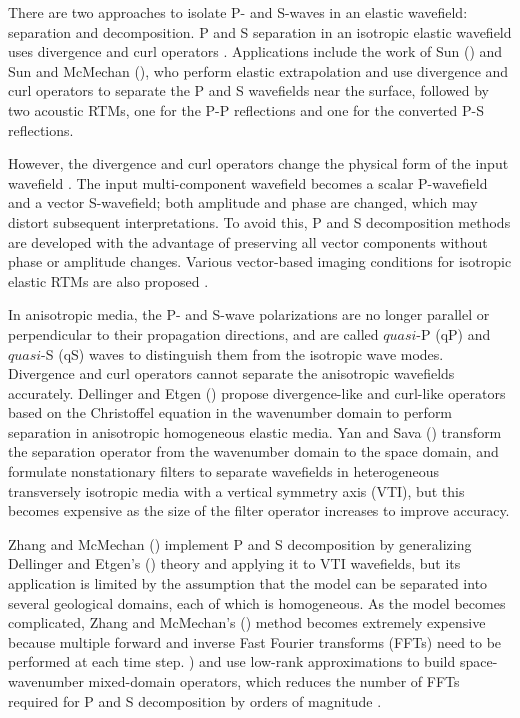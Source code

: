 \documentclass[manuscript,ulem,graphix,revised]{geophysics}
\begin{document}
There are two approaches to isolate P- and S-waves in an elastic wavefield: separation and decomposition. P and S separation in an isotropic elastic wavefield uses divergence and curl operators \citep{morse53,clayton81,mora87}. Applications include the work of Sun (\citeyear{sun99}) and Sun and McMechan (\citeyear{sun01}), who perform elastic extrapolation and use divergence and curl operators to separate the P and S wavefields near the surface, followed by two acoustic RTMs, one for the P-P reflections and one for the converted P-S reflections. 

However, the divergence and curl operators change the physical form of the input wavefield \citep{wenlong_ps15}. The input multi-component wavefield becomes a scalar P-wavefield and a vector S-wavefield; both amplitude and phase are changed, which may distort subsequent interpretations. To avoid this, P and S decomposition methods 
\citep{ma03,zhang07,xiao10,zhang10,wenlong_ps15,wenlong_vsc15}
are developed with the advantage of preserving all vector components without phase or amplitude changes. Various vector-based imaging conditions for isotropic elastic RTMs are also proposed \citep{wenlong_vct15,wenlong_vct16,wang16}.

In anisotropic media, the P- and S-wave polarizations are no longer parallel or perpendicular to their propagation directions, and are called $quasi$-P (qP) and $quasi$-S (qS) waves to distinguish them from the isotropic wave modes. Divergence and curl operators cannot separate the anisotropic wavefields accurately.
Dellinger and Etgen (\citeyear{dellinger90}) propose divergence-like and curl-like operators based on the Christoffel equation in the wavenumber domain to perform separation in anisotropic homogeneous elastic media. Yan and Sava (\citeyear{yan08}) transform the separation operator from the wavenumber domain to the space domain, and formulate nonstationary filters to separate wavefields in heterogeneous transversely isotropic media with a vertical symmetry axis (VTI), but this becomes expensive as the size of the filter operator increases to improve accuracy. 


Zhang and McMechan (\citeyear{zhang10}) implement P and S decomposition by generalizing Dellinger and Etgen's (\citeyear{dellinger90}) theory and applying it to VTI wavefields, but its application is limited by the assumption that the model can be separated into several geological domains, each of which is homogeneous. As the model becomes complicated, Zhang and McMechan's (\citeyear{zhang10}) method becomes extremely expensive because multiple forward and inverse Fast Fourier transforms (FFTs) need to be performed at each time step. \citet{cheng14}) and \citet{Sripanich16} use low-rank approximations to build space-wavenumber mixed-domain operators, which reduces the number of FFTs required for P and S decomposition by orders of magnitude \citep{cheng16,sun16}. 
\end{document}
